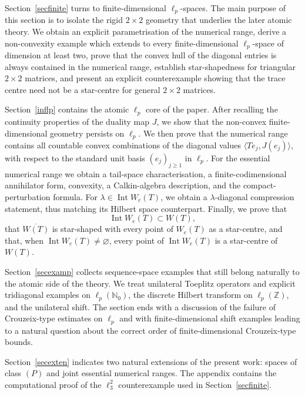 \documentclass[11pt]{amsart}
\numberwithin{equation}{section}
\theoremstyle{definition}
\theoremstyle{remark}
\DeclareMathOperator{\Int}{Int}
\newcommand{\ip}[2]{\langle #1,#2\rangle}
\begin{document}
Section~\ref{secfinite} turns to finite-dimensional \(\ell_p\)-spaces. The
main purpose of this section is to isolate the rigid \(2\times2\) geometry that
underlies the later atomic theory. We obtain an explicit parametrisation of the
numerical range, derive a non-convexity example which extends to
every finite-dimensional \(\ell_p\)-space of dimension at least two, prove that the convex hull of the diagonal entries
is always contained in the numerical range, establish star-shapedness for
triangular \(2\times2\) matrices, and present an explicit counterexample
showing that the trace centre need not be a star-centre for general
\(2\times2\) matrices.

Section~\ref{inflp} contains the atomic $\ell_p$ core of the
paper. After recalling the continuity properties of the duality map \(J\), we
show that the non-convex finite-dimensional geometry persists on \(\ell_p\).
We then prove that the numerical range contains all countable convex
combinations of the diagonal values \(\ip{Te_j}{J(e_j)}\), with respect to the
standard unit basis \((e_j)_{j\ge1}\) in \(\ell_p\). For the essential numerical
range we obtain a tail-space characterisation, a finite-codimensional
annihilator form, convexity, a Calkin-algebra description, and the
compact-perturbation formula. For
\(\lambda\in\Int W_e(T)\), we obtain a \(\lambda\)-diagonal compression statement,
thus matching its Hilbert space counterpart.
Finally, we prove that
\[
        \Int W_e(T)\subset W(T),
\]
that \(\overline{W(T)}\) is star-shaped with every point of \(W_e(T)\) as a
star-centre, and that, when \(\Int W_e(T)\ne\varnothing\), every point of
\(\Int W_e(T)\) is a star-centre of \(W(T)\).

Section~\ref{secexamp} collects sequence-space examples that still belong
naturally to the atomic side of the theory. We treat unilateral Toeplitz
operators and explicit tridiagonal examples on \(\ell_p(\mathbb N_0)\), the
discrete Hilbert transform on \(\ell_p(\mathbb Z)\), and the unilateral shift.
The section ends with a discussion of the failure of Crouzeix-type estimates
on \(\ell_p\) and with finite-dimensional shift examples leading to a natural
question about the correct order of finite-dimensional Crouzeix-type bounds.

Section~\ref{secexten} indicates two natural extensions of the present work:
spaces of class \((P)\) and joint essential numerical ranges. The appendix
contains the computational proof of the \(\ell_3^2\) counterexample used in
Section~\ref{secfinite}.
\end{document}
